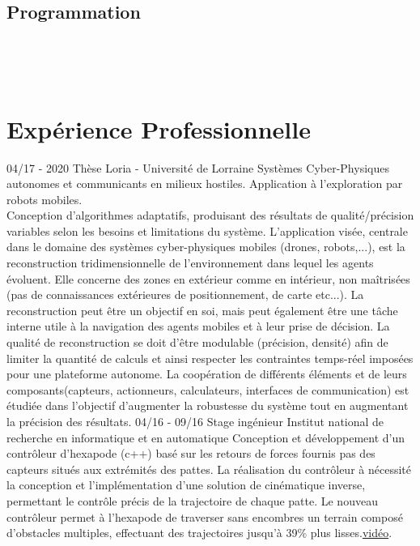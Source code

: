 \documentclass[]{friggeri-cv}
\begin{document}
\begin{aside}
  \section{Programmation}
    ~
\end{aside}
~
\section{Expérience Professionnelle}
\begin{entrylist}
  \entry
    {04/17 - 2020}
    {Thèse}
    {Loria - Université de Lorraine}
    {Systèmes Cyber-Physiques autonomes et communicants en milieux hostiles. Application à l’exploration par robots mobiles. \\
    Conception d'algorithmes adaptatifs, produisant des résultats de qualité/précision variables selon les besoins et limitations du système. L'application visée, centrale dans le domaine des systèmes cyber-physiques mobiles (drones, robots,...), est la reconstruction tridimensionnelle de l’environnement dans lequel les agents évoluent. Elle concerne des zones en extérieur comme en intérieur, non maîtrisées (pas de connaissances extérieures de positionnement, de carte etc...). La reconstruction peut être un objectif en soi, mais peut également être une tâche interne utile à la navigation des agents mobiles et à leur prise de décision. La qualité de reconstruction se doit d'être modulable (précision, densité) afin de limiter la quantité de calculs et ainsi respecter les contraintes temps-réel imposées pour une plateforme autonome. La coopération de différents éléments et de leurs composants(capteurs, actionneurs, calculateurs, interfaces de communication) est étudiée dans l'objectif d'augmenter la robustesse du système tout en augmentant la précision des résultats. 
  }
  \entry
    {04/16 - 09/16}
    {Stage ingénieur}
    {Institut national de recherche en informatique et en automatique}
    {Conception et développement d'un contrôleur d'hexapode (c++) basé sur les retours de forces fournis pas des capteurs situés aux extrémités des pattes. La réalisation du contrôleur à nécessité la conception et l'implémentation d'une solution de cinématique inverse, permettant le contrôle précis de la trajectoire de chaque patte. Le nouveau contrôleur permet à l'hexapode de traverser sans encombres un terrain composé d'obstacles multiples, effectuant des trajectoires jusqu'à 39\% plus lisses.\href{https://www.youtube.com/watch?v=-7WJkv4gbe4}{vidéo}\cite{hexapod}.}

\end{entrylist}
\end{document}
